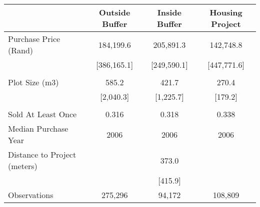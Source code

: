 \begin{tabu}{lccc}
\toprule
 & Outside Buffer & Inside Buffer & Housing Project \\
\midrule
 Purchase Price (Rand)  & 184,199.6  & 205,891.3  & 142,748.8  \\ 
\rowfont{\footnotesize} & [386,165.1]  & [249,590.1]  & [447,771.6]  \\ 
 &  &  &  \\ 
 Plot Size (m3)  & 585.2  & 421.7  & 270.4  \\ 
\rowfont{\footnotesize} & [2,040.3]  & [1,225.7]  & [179.2]  \\ 
 &  &  &  \\ 
 Sold At Least Once  & 0.316  & 0.318  & 0.338  \\ 
 Median Purchase Year  & 2006  & 2006  & 2006  \\ 
 Distance to Project (meters) &  & 373.0  & \\
 \rowfont{\footnotesize} &  & [415.9]  & \\
\midrule
 Observations  & 275,296  & 94,172  & 108,809  \\ 
\bottomrule
\end{tabu}
